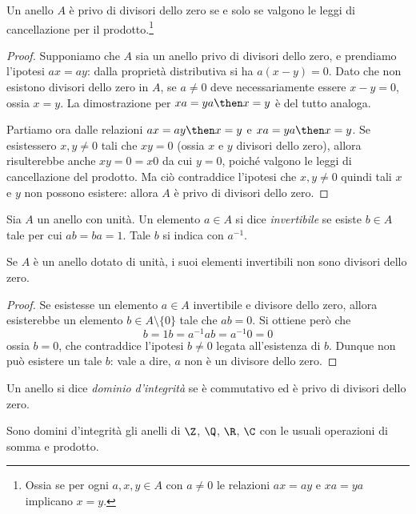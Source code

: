 \begin{teorema}
	Un anello $A$ è privo di divisori dello zero se e solo se valgono le leggi di cancellazione per il prodotto.\footnote{Ossia se per ogni $a,x,y\in A$ con $a\ne 0$ le relazioni $ax=ay$ e $xa=ya$ implicano $x=y$.}
\end{teorema}
\begin{proof}
	Supponiamo che $A$ sia un anello privo di divisori dello zero, e prendiamo l'ipotesi $ax=ay$: dalla proprietà distributiva si ha $a(x-y)=0$.
	Dato che non esistono divisori dello zero in $A$, se $a\ne 0$ deve necessariamente essere $x-y=0$, ossia $x=y$.
	La dimostrazione per $xa=ya\then x=y$ è del tutto analoga.
	
	Partiamo ora dalle relazioni $ax=ay\then x=y$ e $xa=ya\then x=y$.
	Se esistessero $x,y\ne 0$ tali che $xy=0$ (ossia $x$ e $y$ divisori dello zero), allora risulterebbe anche $xy=0=x0$ da cui $y=0$, poich\'e valgono le leggi di cancellazione del prodotto.
	Ma ciò contraddice l'ipotesi che $x,y\ne 0$ quindi tali $x$ e $y$ non possono esistere: allora $A$ è privo di divisori dello zero.
\end{proof}

\begin{definizione} \label{d:elemento-invertibile}
	Sia $A$ un anello con unità.
	Un elemento $a\in A$ si dice \emph{invertibile} se esiste $b\in A$ tale per cui $ab=ba=1$.
	Tale $b$ si indica con $a^{-1}$.
\end{definizione}

\begin{teorema}
	Se $A$ è un anello dotato di unità, i suoi elementi invertibili non sono divisori dello zero.
\end{teorema}
\begin{proof}
	Se esistesse un elemento $a\in A$ invertibile e divisore dello zero, allora esisterebbe un elemento $b\in A\setminus\{0\}$ tale che $ab=0$.
	Si ottiene però che
	\begin{equation}
		b = 1b = a^{-1}ab = a^{-1}0 = 0
	\end{equation}
	ossia $b=0$, che contraddice l'ipotesi $b\ne 0$ legata all'esistenza di $b$.
	Dunque non può esistere un tale $b$: vale a dire, $a$ non è un divisore dello zero.
\end{proof}

\begin{definizione} \label{d:dominio-integrita}
	Un anello si dice \emph{dominio d'integrità} se è commutativo ed è privo di divisori dello zero.
\end{definizione}
Sono domini d'integrità gli anelli di $\Z$, $\Q$, $\R$, $\C$ con le usuali operazioni di somma e prodotto.

